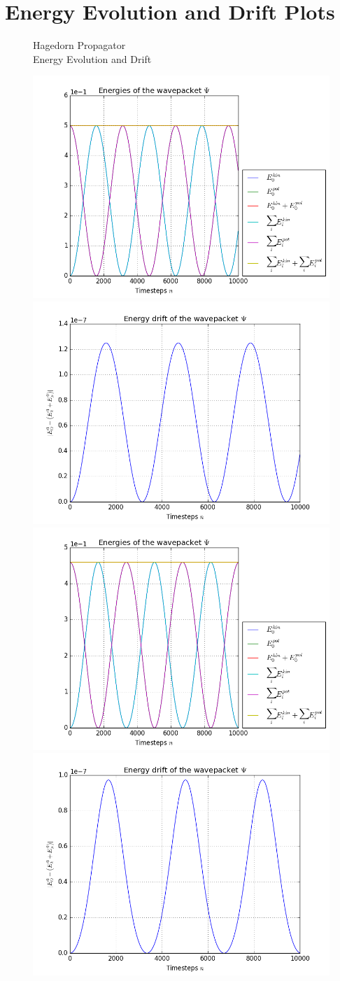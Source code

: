 \appendix

\section{Energy Evolution and Drift Plots}

\begin{figure}[ht]
	\centering
	\begin{minipage}[c]{\textwidth}
		\begin{center}
			\large Hagedorn Propagator \\[1mm]
			\normalsize Energy Evolution and Drift
			\vspace{4mm}
		\end{center}
	\end{minipage}
	\includegraphics[width=.45\textwidth]{figures/harmonic_1D_Hagedorn_energies.png}
	\includegraphics[width=.45\textwidth]{figures/harmonic_1D_Hagedorn_drift.png} \\
	\includegraphics[width=.45\textwidth]{figures/torsional_1D_Hagedorn_energies.png}
	\includegraphics[width=.45\textwidth]{figures/torsional_1D_Hagedorn_drift.png} \\

\end{figure}
